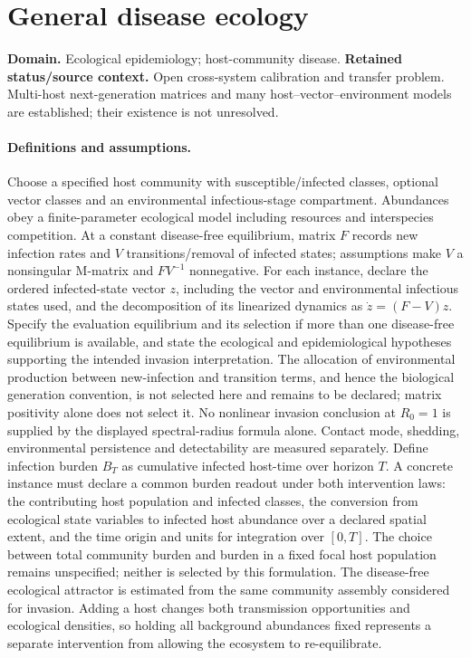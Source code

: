 \documentclass[11pt]{article}
\begin{document}
\section*{General disease ecology}
\label{prob:200}
\label{rank:242}
\par\smallskip

\noindent\textbf{Domain.} Ecological epidemiology; host-community disease. \quad \textbf{Retained status/source context.} Open cross-system calibration and transfer problem. Multi-host next-generation matrices and many host--vector--environment models are established; their existence is not unresolved.
\paragraph{Definitions and assumptions.} Choose a specified host community with susceptible/infected classes, optional vector classes and an environmental infectious-stage compartment. Abundances obey a finite-parameter ecological model including resources and interspecies competition. At a constant disease-free equilibrium, matrix $F$ records new infection rates and $V$ transitions/removal of infected states; assumptions make $V$ a nonsingular M-matrix and $FV^{-1}$ nonnegative. For each instance, declare the ordered infected-state vector $z$, including the vector and environmental infectious states used, and the decomposition of its linearized dynamics as $\dot z=(F-V)z$. Specify the evaluation equilibrium and its selection if more than one disease-free equilibrium is available, and state the ecological and epidemiological hypotheses supporting the intended invasion interpretation. The allocation of environmental production between new-infection and transition terms, and hence the biological generation convention, is not selected here and remains to be declared; matrix positivity alone does not select it. No nonlinear invasion conclusion at $R_0=1$ is supplied by the displayed spectral-radius formula alone. Contact mode, shedding, environmental persistence and detectability are measured separately. Define infection burden $B_T$ as cumulative infected host-time over horizon $T$. A concrete instance must declare a common burden readout under both intervention laws: the contributing host population and infected classes, the conversion from ecological state variables to infected host abundance over a declared spatial extent, and the time origin and units for integration over $[0,T]$. The choice between total community burden and burden in a fixed focal host population remains unspecified; neither is selected by this formulation. The disease-free ecological attractor is estimated from the same community assembly considered for invasion. Adding a host changes both transmission opportunities and ecological densities, so holding all background abundances fixed represents a separate intervention from allowing the ecosystem to re-equilibrate.
\end{document}
